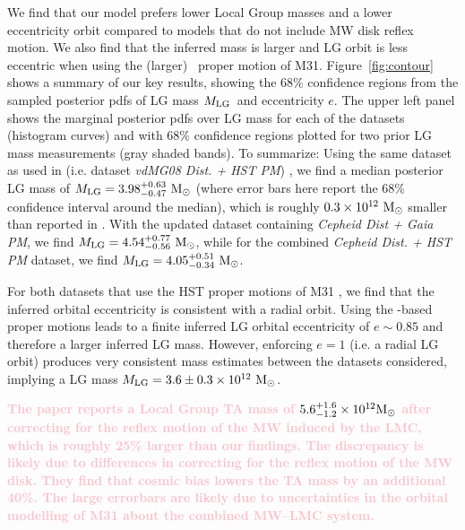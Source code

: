 \documentclass[twocolumn]{aastex631}
\newcommand{\kc}[1]{\textcolor{pink}{\textbf{#1}} }
\newcommand{\mlg}{\ensuremath{M_{\rm LG}}}
\begin{document}
We find that our model prefers lower Local Group masses and a lower eccentricity
orbit compared to models that do not include MW disk reflex motion.
We also find that the inferred mass is larger and LG orbit is less eccentric
when using the (larger) \gaia\ proper motion of M31.
Figure~\ref{fig:contour} shows a summary of our key results, showing the 68\%
confidence regions from the sampled posterior pdfs of LG mass \mlg\ and
eccentricity $e$.
The upper left panel shows the marginal posterior pdfs over LG mass for each of
the datasets (histogram curves) and with 68\% confidence regions plotted for two
prior LG mass measurements (gray shaded bands).
To summarize: Using the same dataset as used in \citet{vdm2012}
(i.e. dataset \textit{vdMG08 Dist. + HST PM})
, we find a
median posterior LG mass of $\mlg = 3.98 ^{+0.63}_{-0.47}~\Msun$ (where error
bars here report the 68\% confidence interval around the median), which is
roughly $0.3\times 10^{12}~\mathrm{M}_\odot$ smaller than reported in \cite{vdm2012}. With
the updated dataset containing \textit{Cepheid Dist + Gaia PM}, we find
$\mlg = 4.54 ^{+0.77}_{-0.56}~\Msun$, while for the combined \textit{Cepheid
Dist. + HST PM} dataset, we find $\mlg = 4.05^{+0.51}_{-0.34}~\Msun$.


For both datasets that use the HST proper motions of M31 \citep{vdm2012}, we
find that the inferred orbital eccentricity is consistent with a radial orbit.
Using the \gaia-based proper motions \citep{Salomon2021} leads to a finite
inferred LG orbital eccentricity of $e\sim 0.85$ and therefore a larger inferred
LG mass.
However, enforcing $e=1$ (i.e. a radial LG orbit) produces very consistent mass
estimates between the datasets considered, implying a LG mass $\mlg = 3.6
\pm 0.3 \times 10^{12}~\Msun$.

\kc{The \cite{Benisty2022} paper reports a Local Group TA mass of 
$5.6^{+1.6}_{-1.2}\times10^{12}\mathrm{M}_\odot$ after correcting for the reflex motion 
of the MW induced by the LMC, which is roughly 25\% larger than our findings. 
The discrepancy is likely due to differences in correcting for the reflex motion
of the MW disk. 
They find that cosmic bias lowers the TA mass by an additional 40\%. 
The large errorbars are likely due to uncertainties in the orbital modelling of
M31 about the combined MW--LMC system.}

\end{document}
